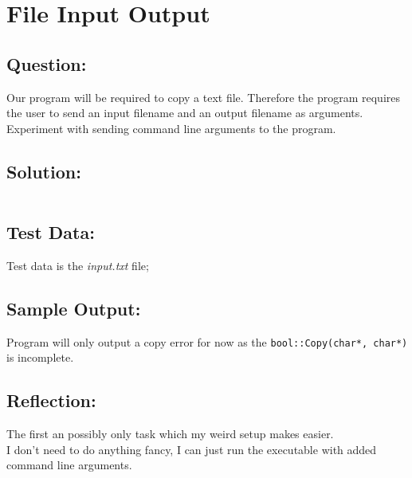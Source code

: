 \documentclass[Lab-C.tex]{subfiles}
\begin{document}
    \section{File Input Output}
        \subsection*{Question:}
            Our program will be required to copy a text file. Therefore the program requires the user to send an input filename and an output filename as arguments.
            Experiment with sending command line arguments to the program.
            
        \subsection*{Solution:}
            \inputminted{cpp}{../01-FileIO/FileIO.cpp}%

        \subsection*{Test Data:}
            Test data is the \textit{input.txt} file;
        
        \subsection*{Sample Output:}
            Program will only output a copy error for now as the \texttt{bool::Copy(char*, char*)}
            is incomplete.

        \subsection*{Reflection:}
            The first an possibly only task which my weird setup makes easier. \\ 
            I don't need to do anything fancy, I can just run the executable
            with added command line arguments.
\end{document}
